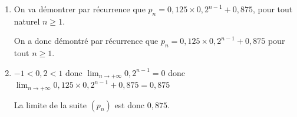 \documentclass[10pt]{article}
\providecommand{\np}[2][]{{#2~#1}}
\providecommand{\no}{{\text{n°}}}
\providecommand{\ds}{\displaystyle}
\begin{document}
\begin{enumerate}
	\begin{enumerate}
		\item Le programme qui permet d'afficher les $n$ premiers termes de la suite $(p_n)$ est le \no 1.
		
En effet, le \no 2 donne $n+1$ termes, et le \no 3 donne des valeurs supérieures à 1.		
		
		\item Avec le programme \no 1, le résultat affiché pour $n = 5$ sera la liste $\left [p_1\;,\; p_2 \;,\; p_3 \;,\; p_4 \;,\; p_5 \strut \right  ]$.
		
$p_1=1$; $p_2=0,9$; $p_3 = 0,88$;
$p_4 = 0,2p_3 + 0,7 = 0,2\times 0,88 + 0,7 = 0,876$	 et\\
$p_5 = 0,2p_4 + 0,7 = 0,2\times 0,876 + 0,7 = \np{0,8752}$
		
Le résultat affiché par \texttt{repas(5)} sera donc $\left [1\;;\; 0,9 \;;\; 0,88 \;;\; 0,876 \;;\; \np{0,8752} \strut \right]$.
		
	\end{enumerate}
\item On va démontrer par récurrence que $p_n = 0,125 \times 0,2^{n - 1} + 0,875$, pour tout naturel $n \geqslant 1$.


On a donc  démontré par récurrence que $p_{n}= 0,125 \times 0,2^{n -1} + 0,875$ pour tout $n\geqslant 1$.

\item 
$-1<0,2<1$ donc $\ds\lim_{n\to +\infty} 0,2^{n-1}=0$ donc  $\ds\lim_{n\to +\infty} 0,125 \times0,2^{n-1} + 0,875 = 0,875$

La limite de la suite $(p_n)$ est donc $0,875$.
\end{enumerate}

\bigskip
\end{document}
